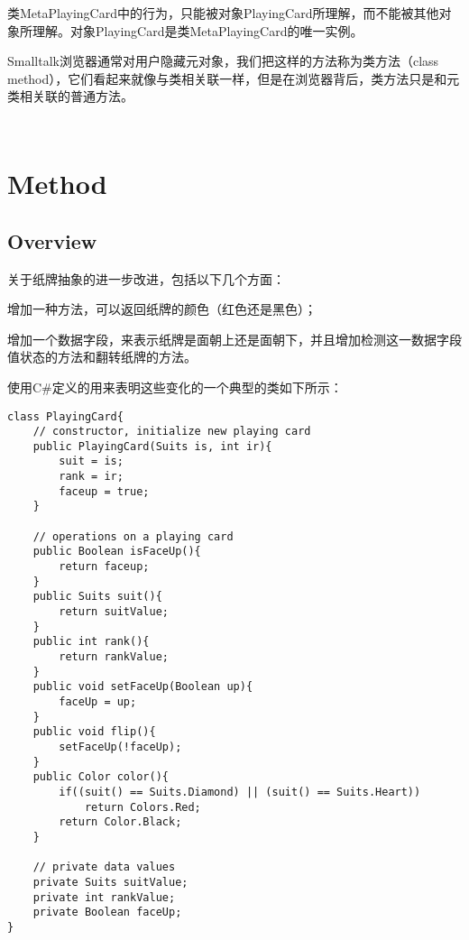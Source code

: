 类MetaPlayingCard中的行为，只能被对象PlayingCard所理解，而不能被其他对象所理解。对象PlayingCard是类MetaPlayingCard的唯一实例。

Smalltalk浏览器通常对用户隐藏元对象，我们把这样的方法称为类方法（class method），它们看起来就像与类相关联一样，但是在浏览器背后，类方法只是和元类相关联的普通方法。


\begin{lstlisting}[language=C++]

\end{lstlisting}





\begin{lstlisting}[language=C++]

\end{lstlisting}




\chapter{Method}



\section{Overview}


关于纸牌抽象的进一步改进，包括以下几个方面：

\begin{compactitem}
\item 增加一种方法，可以返回纸牌的颜色（红色还是黑色）；
\item 增加一个数据字段，来表示纸牌是面朝上还是面朝下，并且增加检测这一数据字段值状态的方法和翻转纸牌的方法。
\end{compactitem}


使用C\#定义的用来表明这些变化的一个典型的类如下所示：

\begin{lstlisting}[language={[Sharp]C}]
class PlayingCard{
	// constructor, initialize new playing card
	public PlayingCard(Suits is, int ir){
		suit = is;
		rank = ir;
		faceup = true;
	}
	
	// operations on a playing card
	public Boolean isFaceUp(){
		return faceup;
	}
	public Suits suit(){
		return suitValue;
	}
	public int rank(){
		return rankValue;
	}
	public void setFaceUp(Boolean up){
		faceUp = up;
	}
	public void flip(){
		setFaceUp(!faceUp);
	}
	public Color color(){
		if((suit() == Suits.Diamond) || (suit() == Suits.Heart))
			return Colors.Red;
		return Color.Black;
	}
	
	// private data values
	private Suits suitValue;
	private int rankValue;
	private Boolean faceUp;
}
\end{lstlisting}



